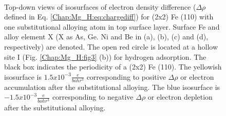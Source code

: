 \newpage
\begingroup
\begin{figure}[!ht]
  \centering
  \label{Chap:Mg_H:fig:9a}
  \label{Chap:Mg_H:fig:9b}
  \\
  \label{Chap:Mg_H:fig:9c}
  \label{Chap:Mg_H:fig:9d}
\caption[Top-down views of isosurfaces of electron density difference for (2x2) Fe (110) with one substitutional alloying atom in top surface layer]{Top-down views of isosurfaces of electron density difference ($\Delta \rho$ defined in Eq. \ref{Chap:Mg_H:eq:chargediff}) for (2x2) Fe (110) with one substitutional alloying atom in top surface layer. Surface Fe and alloy element X (X as As, Ge. Ni and Be in (a), (b), (c) and (d), respectively) are denoted. The open red circle is located at a hollow site I (Fig. \ref{Chap:Mg_H:fig3} (b)) for hydrogen adsorption. The black box indicates the periodicity of a (2x2) Fe (110). The yellowish isosurface is $1.5x10^{-3}\frac{e}{bohr^3}$ corresponding to positive $\Delta \rho$ or electron accumulation after the substitutional alloying. The blue isosurface is $-1.5x10^{-3}\frac{e}{bohr^3}$ corresponding to negative $\Delta \rho$ or electron depletion after the substitutional alloying.}
  \label{Chap:Mg_H:fig9}
\end{figure}
\endgroup





